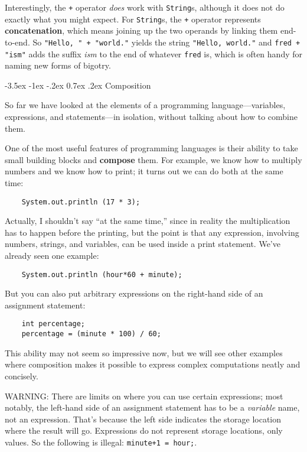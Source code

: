 \documentclass{book}
\makeatletter
\renewcommand{\section}{\@startsection 
    {section} {1} {0mm}%
    {-3.5ex \@plus -1ex \@minus -.2ex}%
    {0.7ex \@plus.2ex}%
    {\normalfont\Large\bfseries}}
\makeatother
\begin{document}

Interestingly, the {\tt +} operator {\em does} work with
{\tt String}s, although it does not do exactly what you might expect.
For {\tt String}s, the {\tt +} operator represents {\bf concatenation},
which means joining up the two operands by linking them
end-to-end.  So {\tt "Hello, " + "world."} yields the string
{\tt "Hello, world."} and {\tt fred + "ism"} adds the suffix
{\em ism} to the end of whatever {\tt fred} is, which is often
handy for naming new forms of bigotry.

\section{Composition}

So far we have looked at the elements of a programming
language---variables, expressions, and statements---in
isolation, without talking about how to combine them.

One of the most useful features of programming languages
is their ability to take small building blocks and
{\bf compose} them.  For example, we know how to multiply
numbers and we know how to print; it turns out we can
do both at the same time:

\begin{verbatim}
    System.out.println (17 * 3);
\end{verbatim}
%
Actually, I shouldn't say ``at the same time,'' since in reality
the multiplication has to happen before the printing, but
the point is that any expression, involving numbers, strings,
and variables, can be used inside a print statement.  We've
already seen one example:

\begin{verbatim}
    System.out.println (hour*60 + minute);
\end{verbatim}
%
But you can also put arbitrary expressions on the right-hand
side of an assignment statement:

\begin{verbatim}
    int percentage;
    percentage = (minute * 100) / 60;
\end{verbatim}
%
This ability may not seem so impressive now, but we will see
other examples where composition makes it possible
to express complex computations neatly and concisely.

WARNING: There are limits on where you can use certain
expressions; most notably, the left-hand side of an assignment
statement has to be a {\em variable} name, not an expression.
That's because the left side indicates the storage location
where the result will go.  Expressions
do not represent storage locations, only values.  So the
following is illegal:  {\tt minute+1 = hour;}.
\end{document}
